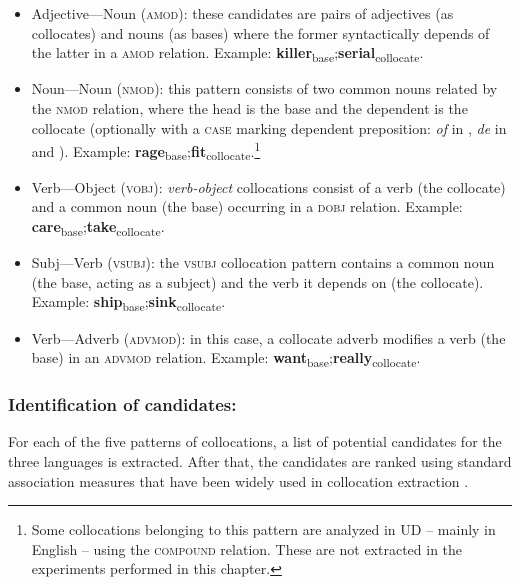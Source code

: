 \documentclass[output=paper,modfonts,nonflat]{langsci/langscibook}
\begin{document}
\begin{itemize}
\item Adjective---Noun (\textsc{amod}): these candidates are pairs of adjectives
(as collocates) and nouns (as bases) where the former syntactically depends
of the latter in a \textsc{amod} relation.
Example: \textbf{killer}\textsubscript{base};\textbf{serial}\textsubscript{collocate}.

\item Noun---Noun (\textsc{nmod}): this pattern consists of two common
nouns related by the \textsc{nmod} relation, where the head is the base
and the dependent is the collocate (optionally with a \textsc{case} marking
dependent preposition: \emph{of} in , \emph{de} in  and ).
Example: \textbf{rage}\textsubscript{base};\textbf{fit}\textsubscript{collocate}.\footnote{Some
  collocations belonging to this pattern are analyzed in UD -- mainly in English --
  using the \textsc{compound} relation. These are not extracted in the experiments performed in this chapter.}

\item Verb---Object (\textsc{vobj}): \emph{verb-object} collocations consist
of a verb (the collocate) and a common noun (the base)
occurring in a \textsc{dobj} relation.
Example: \textbf{care}\textsubscript{base};\textbf{take}\textsubscript{collocate}.

\item Subj---Verb (\textsc{vsubj}): the \textsc{vsubj} collocation pattern contains a
  common noun (the base, acting as a subject) and the verb it depends on
  (the collocate).
  Example: \textbf{ship}\textsubscript{base};\textbf{sink}\textsubscript{collocate}.
  
\item Verb---Adverb (\textsc{advmod}): in this case, a collocate adverb modifies
  a verb (the base) in an \textsc{advmod} relation.
  Example: \textbf{want}\textsubscript{base};\textbf{really}\textsubscript{collocate}.
\end{itemize}

\subsubsection{Identification of candidates:} For each of the five patterns of
collocations, a list of potential candidates for the three languages is extracted.
After that, the candidates are ranked using standard association measures that have
been widely used in collocation extraction \citep{evert2008}.
\end{document}
